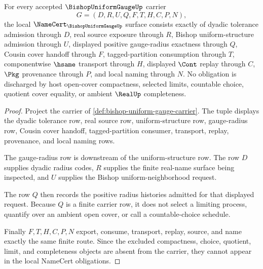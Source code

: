 \begin{theorem}
\label{thm:bishop-uniform-gauge-namecert-obligations}
For every accepted $\BishopUniformGaugeUp$ carrier
$$
G=(D,R,U,Q,F,T,H,C,P,N),
$$
the local $\NameCert_{\BishopUniformGaugeUp}$ surface consists exactly of dyadic tolerance admission through $D$, real source exposure through $R$, Bishop uniform-structure admission through $U$, displayed positive gauge-radius exactness through $Q$, Cousin cover handoff through $F$, tagged-partition consumption through $T$, componentwise $\hsame$ transport through $H$, displayed $\Cont$ replay through $C$, $\Pkg$ provenance through $P$, and local naming through $N$. No obligation is discharged by host open-cover compactness, selected limits, countable choice, quotient cover equality, or ambient $\RealUp$ completeness.
\end{theorem}
\begin{proof}
Project the carrier of \autoref{def:bishop-uniform-gauge-carrier}. The tuple displays the dyadic tolerance row, real source row, uniform-structure row, gauge-radius row, Cousin cover handoff, tagged-partition consumer, transport, replay, provenance, and local naming rows.

The gauge-radius row is downstream of the uniform-structure row. The row $D$ supplies dyadic radius codes, $R$ supplies the finite real-name surface being inspected, and $U$ supplies the Bishop uniform-neighborhood request.

The row $Q$ then records the positive radius histories admitted for that displayed request. Because $Q$ is a finite carrier row, it does not select a limiting process, quantify over an ambient open cover, or call a countable-choice schedule.

Finally $F,T,H,C,P,N$ export, consume, transport, replay, source, and name exactly the same finite route. Since the excluded compactness, choice, quotient, limit, and completeness objects are absent from the carrier, they cannot appear in the local NameCert obligations.
\end{proof}

